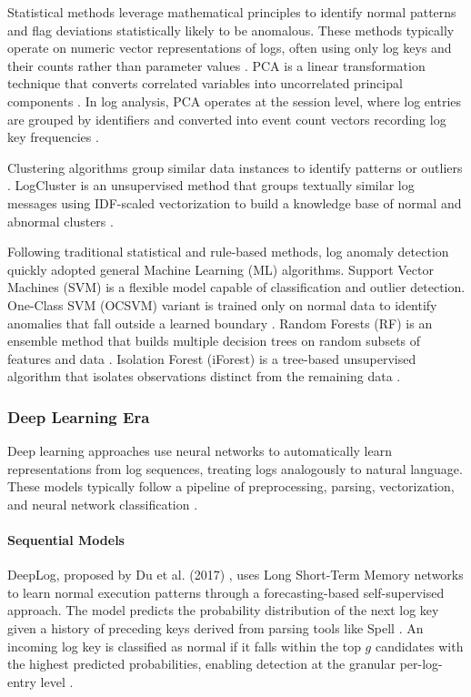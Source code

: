 Statistical methods leverage mathematical principles to identify normal patterns and flag deviations statistically likely to be anomalous. These methods typically operate on numeric vector representations of logs, often using only log keys and their counts rather than parameter values \cite{SystemLog, DeepLog}. PCA is a linear transformation technique that converts correlated variables into uncorrelated principal components \cite{LAnoBERT, geron2019hands}. In log analysis, PCA operates at the session level, where log entries are grouped by identifiers and converted into event count vectors recording log key frequencies \cite{SystemLog}.

Clustering algorithms group similar data instances to identify patterns or outliers \cite{alammar2024hands, geron2019hands}. LogCluster is an unsupervised method that groups textually similar log messages using IDF-scaled vectorization to build a knowledge base of normal and abnormal clusters \cite{SystemLog, LogCTBL}.

Following traditional statistical and rule-based methods, log anomaly detection quickly adopted general Machine Learning (ML) algorithms. Support Vector Machines (SVM) is a flexible model capable of classification and outlier detection. One-Class SVM (OCSVM) variant is trained only on normal data to identify anomalies that fall outside a learned boundary \cite{oneclasssvm,geron2019hands}. Random Forests (RF) is an ensemble method that builds multiple decision trees on random subsets of features and data \cite{muller2016introduction,ali2025}. Isolation Forest (iForest) is a tree-based unsupervised algorithm that isolates observations distinct from the remaining data \cite{IsolationForest,LAnoBERT,geron2019hands}.


\subsubsection{Deep Learning Era}

Deep learning approaches use neural networks to automatically learn representations from log sequences, treating logs analogously to natural language. These models typically follow a pipeline of preprocessing, parsing, vectorization, and neural network classification \cite{hashemi2025}.

\paragraph*{Sequential Models}
DeepLog, proposed by Du et al. (2017) \cite{DeepLog}, uses Long Short-Term Memory networks to learn normal execution patterns through a forecasting-based self-supervised approach. The model predicts the probability distribution of the next log key given a history of preceding keys derived from parsing tools like Spell \cite{Spell,robust}. An incoming log key is classified as normal if it falls within the top $g$ candidates with the highest predicted probabilities, enabling detection at the granular per-log-entry level \cite{LogCTBL}.

